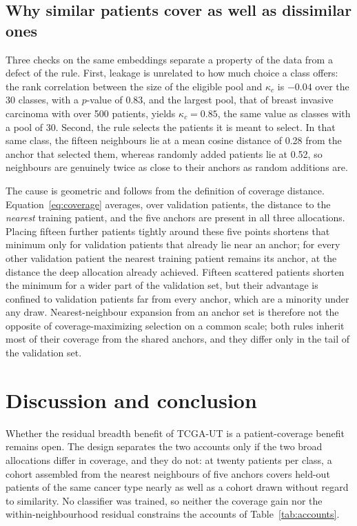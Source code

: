 \subsection{Why similar patients cover as well as dissimilar ones}
\label{sec:diagnosis}
Three checks on the same embeddings separate a property of the data from a defect of the rule. First, leakage is unrelated to how much choice a class offers: the rank correlation between the size of the eligible pool and $\kappa_c$ is $-0.04$ over the 30 classes, with a $p$-value of 0.83, and the largest pool, that of breast invasive carcinoma with over 500 patients, yields $\kappa_c=0.85$, the same value as classes with a pool of 30. Second, the rule selects the patients it is meant to select. In that same class, the fifteen neighbours lie at a mean cosine distance of 0.28 from the anchor that selected them, whereas randomly added patients lie at 0.52, so neighbours are genuinely twice as close to their anchors as random additions are.

The cause is geometric and follows from the definition of coverage distance. Equation~\eqref{eq:coverage} averages, over validation patients, the distance to the \emph{nearest} training patient, and the five anchors are present in all three allocations. Placing fifteen further patients tightly around these five points shortens that minimum only for validation patients that already lie near an anchor; for every other validation patient the nearest training patient remains its anchor, at the distance the deep allocation already achieved. Fifteen scattered patients shorten the minimum for a wider part of the validation set, but their advantage is confined to validation patients far from every anchor, which are a minority under any draw. Nearest-neighbour expansion from an anchor set is therefore not the opposite of coverage-maximizing selection on a common scale; both rules inherit most of their coverage from the shared anchors, and they differ only in the tail of the validation set.

\section{Discussion and conclusion}
\label{sec:discussion}
Whether the residual breadth benefit of TCGA-UT is a patient-coverage benefit remains open. The design separates the two accounts only if the two broad allocations differ in coverage, and they do not: at twenty patients per class, a cohort assembled from the nearest neighbours of five anchors covers held-out patients of the same cancer type nearly as well as a cohort drawn without regard to similarity. No classifier was trained, so neither the coverage gain nor the within-neighbourhood residual constrains the accounts of Table~\ref{tab:accounts}.

